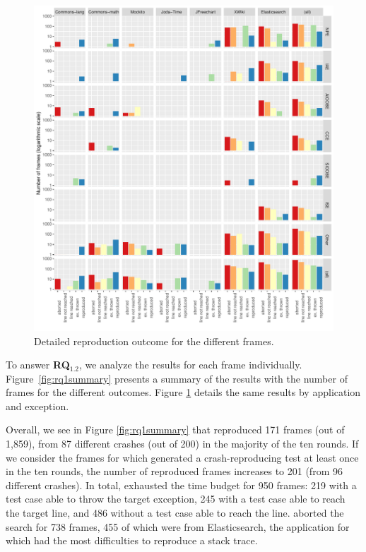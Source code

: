 \begin{figure}[h!]
	\centering
	\includegraphics[width=\textwidth]{papers/jcrashpack/rq1_all.pdf}
	\caption{Detailed reproduction outcome for the different frames.}
	\label{figure:outcomecomp}
\end{figure}

To answer \textbf{RQ$_{1.2}$}, we analyze the results for each frame individually.
%
Figure~\ref{fig:rq1summary} presents a summary of the results with the number of frames for the different outcomes. Figure \ref{figure:outcomecomp} details the same results by application and exception. 

Overall, we see in Figure \ref{fig:rq1summary} that \evocrash reproduced 171 frames (out of 1,859), from 87 different crashes (out of 200) in the majority of the ten rounds. If we consider the frames for which \evocrash generated a crash-reproducing test at least once in the ten rounds, the number of reproduced frames increases to 201 (from 96 different crashes).
%
In total, \evocrash exhausted the time budget for 950 frames: 219 with a test case able to throw the target exception, 245 with a test case able to reach the target line, and 486 without a test case able to reach the line. 
\evocrash aborted the search for 738 frames, 455 of which were from Elasticsearch, the application for which \evocrash had the most difficulties to reproduce a stack trace. 

